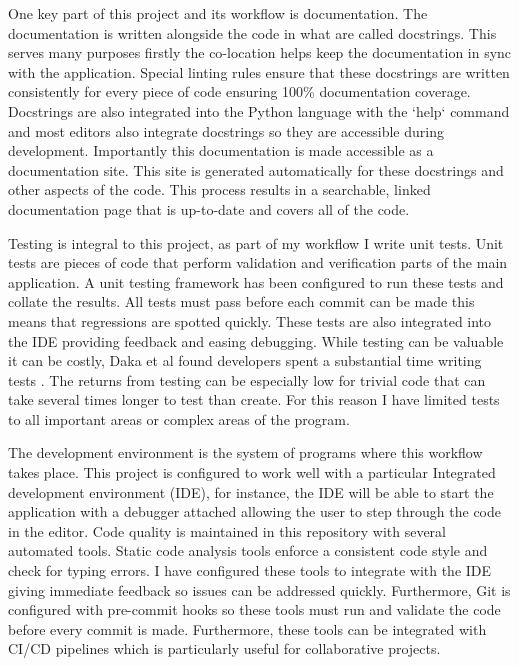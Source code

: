 \documentclass[]{final_report}
\begin{document}
One key part of this project and its workflow is documentation. The documentation is written alongside the code in what are called docstrings. This serves many purposes firstly the co-location helps keep the documentation in sync with the application. Special linting rules ensure that these docstrings are written consistently for every piece of code ensuring 100\% documentation coverage. Docstrings are also integrated into the Python language with the `help` command and most editors also integrate docstrings so they are accessible during development. Importantly this documentation is made accessible as a documentation site. This site is generated automatically for these docstrings and other aspects of the code. This process results in a searchable, linked documentation page that is up-to-date\cite{pythonAutoDoc} and covers all of the code. 

Testing is integral to this project, as part of my workflow I write unit tests. Unit tests are pieces of code that perform validation and verification parts of the main application. A unit testing framework has been configured to run these tests and collate the results. All tests must pass before each commit can be made this means that regressions are spotted quickly. These tests are also integrated into the IDE providing feedback and easing debugging.  While testing can be valuable it can be costly, Daka et al found developers spent a substantial time writing tests \cite{unitTestingSurvey}. The returns from testing can be especially low for trivial code that can take several times longer to test than create. For this reason I have limited tests to all important areas or complex areas of the program.  

The development environment is the system of programs where this workflow takes place. This project is configured to work well with a particular Integrated development environment (IDE), for instance, the IDE will be able to start the application with a debugger attached allowing the user to step through the code in the editor. Code quality is maintained in this repository with several automated tools. Static code analysis tools enforce a consistent code style and check for typing errors. I have configured these tools to integrate with the IDE giving immediate feedback so issues can be addressed quickly. Furthermore, Git is configured with pre-commit hooks so these tools must run and validate the code before every commit is made. Furthermore, these tools can be integrated with CI/CD pipelines which is particularly useful for collaborative projects.
\end{document}

